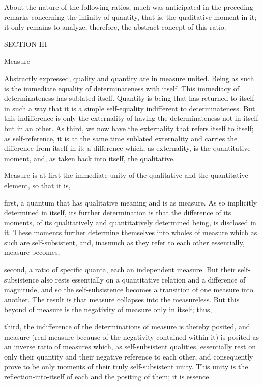 About the nature of the following ratios,
much was anticipated in the preceding remarks
concerning the infinity of quantity, that is,
the qualitative moment in it;
it only remains to analyze, therefore,
the abstract concept of this ratio.

SECTION III

Measure

Abstractly expressed, quality and quantity are in measure united.
Being as such is the immediate equality of determinateness with itself.
This immediacy of determinateness has sublated itself.
Quantity is being that has returned to itself in such a way
that it is a simple self-equality indifferent to determinateness.
But this indifference is only the externality of having
the determinateness not in itself but in an other.
As third, we now have the externality that refers itself to itself;
as self-reference, it is at the same time sublated externality and
carries the difference from itself in it;
a difference which, as externality, is the quantitative moment,
and, as taken back into itself, the qualitative.

Measure is at first the immediate unity of
the qualitative and the quantitative element, so that it is,

first, a quantum that has qualitative meaning and is as measure.
As so implicitly determined in itself, its further determination is that
the difference of its moments,
of its qualitatively and quantitatively determined being,
is disclosed in it.
These moments further determine themselves into
wholes of measure which as such are self-subsistent,
and, inasmuch as they refer to each other essentially,
measure becomes,

second, a ratio of specific quanta, each an independent measure.
But their self-subsistence also rests essentially
on a quantitative relation and a difference of magnitude,
and so the self-subsistence becomes a transition
of one measure into another.
The result is that measure collapses into the measureless.
But this beyond of measure is the negativity of measure
only in itself; thus,

third, the indifference of the determinations of
measure is thereby posited, and measure
(real measure because of the negativity contained within it)
is posited as an inverse ratio of measures
which, as self-subsistent qualities,
essentially rest on only their quantity
and their negative reference to each other,
and consequently prove to be only moments of
their truly self-subsistent unity.
This unity is the reflection-into-itself of each
and the positing of them; it is essence.

